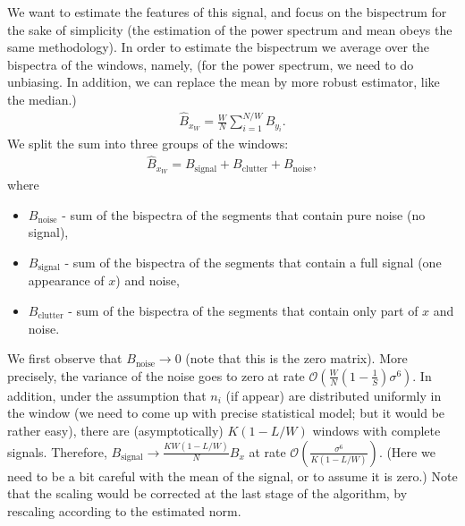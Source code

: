 \documentclass[12pt,a4paper]{article}
\theoremstyle{plain}
\theoremstyle{definition}
\theoremstyle{remark}
\theoremstyle{plain}
\theoremstyle{remark}
\theoremstyle{plain}
\theoremstyle{plain}
\newcommand{\order}[1]{\mathcal{O}\left({#1} \right)}
\begin{document}
 We want to estimate the features of this signal, and focus on the bispectrum for the sake of simplicity (the estimation of the power spectrum and mean obeys the same methodology). 
In order to estimate the bispectrum we average over the bispectra of the windows, namely, (for the power spectrum, we need to do unbiasing. In addition, we can replace the mean by more robust estimator, like the median.)
\begin{eqnarray}
\hat{B}_{x_W} = \frac{W}{N}\sum_{i=1}^{N/W}B_{y_i}.
\end{eqnarray}
We split the sum into three groups of the windows:
\begin{eqnarray}
\hat{B}_{x_W} = B_\textrm{signal} + B_\textrm{clutter} + B_\textrm{noise}, 
\end{eqnarray}
where
\begin{itemize}
	\item $B_\textrm{noise}$ - sum of the bispectra of the segments that contain pure noise (no signal),
	\item $B_\textrm{signal}$ - sum of the bispectra of the segments that contain a full signal (one appearance of $x$) and noise,
	\item $B_\textrm{clutter}$ - sum of the bispectra of the segments that contain only part of $x$ and noise.
\end{itemize}

We first observe that $B_\textrm{noise}\to 0$ (note that this is the zero matrix). More precisely, the variance of the noise goes to zero at rate  $\order{\frac{W}{N}\left(1-\frac{1}{S}\right)\sigma^6}$. In addition, under the assumption that $n_i$ (if appear) are distributed uniformly in the window (we need to come up with precise statistical model; but it would be rather easy), there are (asymptotically) $K(1-L/W)$ windows with complete signals. Therefore,
 $B_\textrm{signal}\to \frac{KW(1-L/W)}{N}B_x$ at rate $\order{\frac{\sigma^6}{K(1-L/W)}}$. (Here we need to be a bit careful with the mean of the signal, or to assume it is zero.) Note that the scaling would be corrected at the last stage of the algorithm, by rescaling according to the estimated  norm.
 
\end{document}
